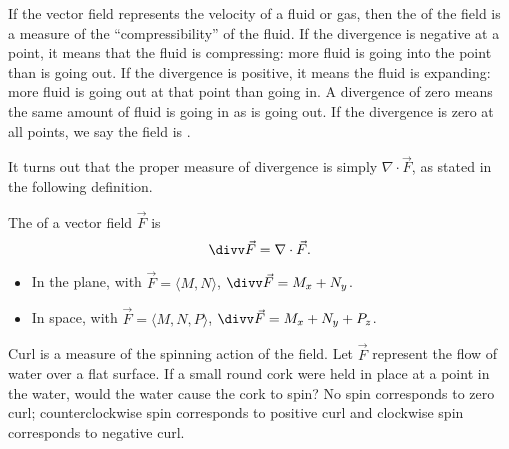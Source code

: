 If the vector field represents the velocity of a fluid or gas, then the  of the field is a measure of the ``compressibility'' of the fluid. If the divergence is negative at a point, it means that the fluid is compressing: more fluid is going into the point than is going out. If the divergence is positive, it means the fluid is expanding: more fluid is going out at that point than going in. A divergence of zero means the same amount of fluid is going in as is going out. If the divergence is zero at all points, we say the field is . 

It turns out that the proper measure of divergence is simply $\nabla \cdot \vec F$, as stated in the following definition.

{The  of a vector field $\vec F$ is
$$\divv \vec F = \nabla \cdot \vec F.$$
\begin{itemize}
	\item In the plane, with $\vec F = \langle M,N\rangle$, $\divv \vec F = M_x+N_y$.
	\item	In space, with $\vec F = \langle M,N,P\rangle$, $\divv \vec F = M_x+N_y+P_z$.
\end{itemize}
}


Curl is a measure of the spinning action of the field. Let $\vec F$ represent the flow of water over a flat surface. If a small round cork were held in place at a point in the water, would the water cause the cork to spin? No spin corresponds to zero curl; counterclockwise spin corresponds to positive curl and clockwise spin corresponds to negative curl. 

